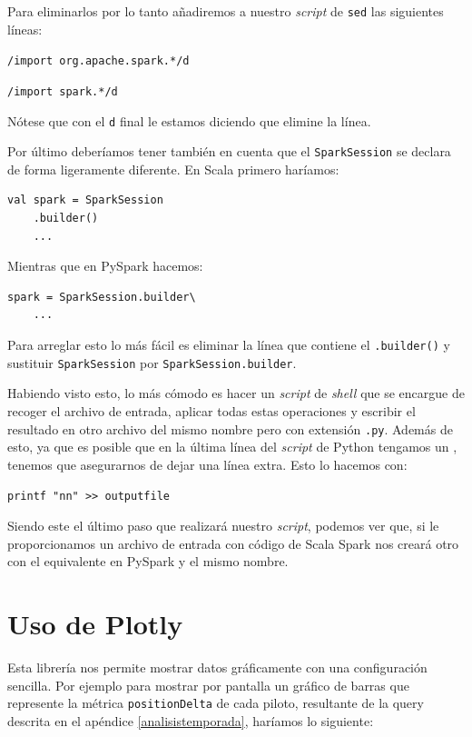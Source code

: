 \documentclass[12pt,twoside,titlepage]{report}
\begin{document}
Para eliminarlos por lo tanto añadiremos a nuestro \textit{script} de \texttt{sed} las siguientes líneas:

\texttt{/import org.apache.spark.*/d}

\texttt{/import spark.*/d}

Nótese que con el \texttt{d} final le estamos diciendo que elimine la línea.

Por último deberíamos tener también en cuenta que el \texttt{SparkSession} se declara de forma ligeramente diferente. En Scala primero haríamos:

\begin{lstlisting}
val spark = SparkSession
	.builder()
	...
\end{lstlisting}

Mientras que en PySpark hacemos:

\begin{lstlisting}
spark = SparkSession.builder\
	...
\end{lstlisting}

Para arreglar esto lo más fácil es eliminar la línea que contiene el \texttt{.builder()} y sustituir \texttt{SparkSession} por \texttt{SparkSession.builder}.

Habiendo visto esto, lo más cómodo es hacer un \textit{script} de \textit{shell} que se encargue de recoger el archivo de entrada, aplicar todas estas operaciones y escribir el resultado en otro archivo del mismo nombre pero con extensión \texttt{.py}. Además de esto, ya que es posible que en la última línea del \textit{script} de Python tengamos un \texttt{}, tenemos que asegurarnos de dejar una línea extra. Esto lo hacemos con:

\texttt{printf "nn" >> outputfile}

Siendo este el último paso que realizará nuestro \textit{script}, podemos ver que, si le proporcionamos un archivo de entrada con código de Scala Spark nos creará otro con el equivalente en PySpark y el mismo nombre.


\section{Uso de Plotly}
\label{plotly}

Esta librería nos permite mostrar datos gráficamente con una configuración sencilla. Por ejemplo para mostrar por pantalla un gráfico de barras que represente la métrica \texttt{positionDelta} de cada piloto, resultante de la query descrita en el apéndice \ref{analisistemporada}, haríamos lo siguiente:
\end{document}
